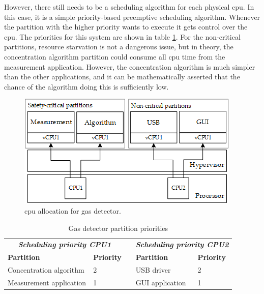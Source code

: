 However, there still needs to be a scheduling algorithm for each physical \acrshort{cpu}. In this case, it is a simple priority-based preemptive scheduling algorithm. Whenever the partition with the higher priority wants to execute it gets control over the \acrshort{cpu}. The priorities for this system are shown in table \ref{tab:gasdetect_priorities}. For the non-critical partitions, resource starvation is not a dangerous issue, but in theory, the concentration algorithm partition could consume all \acrshort{cpu} time from the measurement application. However, the concentration algorithm is much simpler than the other applications, and it can be mathematically asserted that the chance of the algorithm doing this is sufficiently low.

\begin{figure}[ht!]
\centering
\includegraphics[scale=0.8]{Figures/gas_detect_vcpu_schedule.png}
\decoRule
\caption{\acrshort{cpu} allocation for gas detector.}
\label{fig:gas_detect_vcpu_schedule}
\end{figure}

\begin{table}[hb!]
\centering
\begin{tabular}{lllll}
\multicolumn{2}{c}{\textit{\textbf{Scheduling priority CPU1}}}                         &                       & \multicolumn{2}{c}{\textit{\textbf{Scheduling priority CPU2}}}                   \\ \cline{1-2} \cline{4-5} 
\multicolumn{1}{|l|}{\textbf{Partition}}      & \multicolumn{1}{l|}{\textbf{Priority}} & \multicolumn{1}{l|}{} & \multicolumn{1}{l|}{\textbf{Partition}} & \multicolumn{1}{l|}{\textbf{Priority}} \\ \cline{1-2} \cline{4-5} 
\multicolumn{1}{|l|}{Concentration algorithm} & \multicolumn{1}{l|}{2}                 & \multicolumn{1}{l|}{} & \multicolumn{1}{l|}{USB driver}         & \multicolumn{1}{l|}{2}                 \\ \cline{1-2} \cline{4-5} 
\multicolumn{1}{|l|}{Measurement application} & \multicolumn{1}{l|}{1}                 & \multicolumn{1}{l|}{} & \multicolumn{1}{l|}{GUI application}    & \multicolumn{1}{l|}{1}                 \\ \cline{1-2} \cline{4-5} 
\end{tabular}
\caption{Gas detector partition priorities}
\label{tab:gasdetect_priorities}
\end{table}

